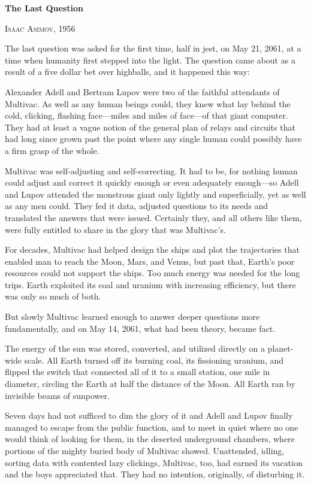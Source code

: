 {\centering
  \headingfont
  \fontsize{20pt}{1em}\selectfont
  \textbf{The Last Question}
  
  \normalfont
  \normalsize{}
  \textsc{Isaac Asimov, 1956}
  \par
}

\medskip

The last question was asked for the first time, half in jest, on May 21, 2061, at a time when humanity first stepped into the light. The question came about as a result of a five dollar bet over highballs, and it happened this way:

Alexander Adell and Bertram Lupov were two of the faithful attendants of Multivac. As well as any human beings could, they knew what lay behind the cold, clicking, flashing face---miles and miles of face---of that giant computer. They had at least a vague notion of the general plan of relays and circuits that had long since grown past the point where any single human could possibly have a firm grasp of the whole.

Multivac was self-adjusting and self-correcting. It had to be, for nothing human could adjust and correct it quickly enough or even adequately enough---so Adell and Lupov attended the monstrous giant only lightly and superficially, yet as well as any men could. They fed it data, adjusted questions to its needs and translated the answers that were issued. Certainly they, and all others like them, were fully entitled to share in the glory that was Multivac's.

For decades, Multivac had helped design the ships and plot the trajectories that enabled man to reach the Moon, Mars, and Venus, but past that, Earth's poor resources could not support the ships. Too much energy was needed for the long trips. Earth exploited its coal and uranium with increasing efficiency, but there was only so much of both.

But slowly Multivac learned enough to answer deeper questions more fundamentally, and on May 14, 2061, what had been theory, became fact.

The energy of the sun was stored, converted, and utilized directly on a planet-wide scale. All Earth turned off its burning coal, its fissioning uranium, and flipped the switch that connected all of it to a small station, one mile in diameter, circling the Earth at half the distance of the Moon. All Earth ran by invisible beams of sunpower.

Seven days had not sufficed to dim the glory of it and Adell and Lupov finally managed to escape from the public function, and to meet in quiet where no one would think of looking for them, in the deserted underground chambers, where portions of the mighty buried body of Multivac showed. Unattended, idling, sorting data with contented lazy clickings, Multivac, too, had earned its vacation and the boys appreciated that. They had no intention, originally, of disturbing it.


